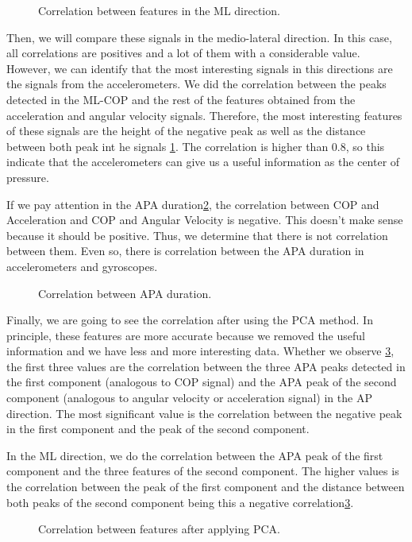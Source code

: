 \begin{figure}[H]
	\centering
	\caption{Correlation between features in the ML direction.}
	\label{fig:Corr_ML}
\end{figure}

Then, we will compare these signals in the medio-lateral direction. In this case, all correlations are positives and a lot of them with a considerable value. However, we can identify that the most interesting signals in this directions are the signals from the accelerometers. We did the correlation between the peaks detected in the ML-COP and the rest of the features obtained from the acceleration and angular velocity signals. Therefore, the most interesting features of these signals are the height of the negative peak as well as the distance between both peak int he signals \ref{fig:Corr_ML}. The correlation is higher than 0.8, so this indicate that the accelerometers can give us a useful information as the center of pressure.

If we pay attention in the APA duration\ref{fig:Corr_duration}, the correlation between COP and Acceleration and COP and Angular Velocity is negative. This doesn't make sense because it should be positive. Thus, we determine that there is not correlation between them. Even so, there is correlation between the APA duration in accelerometers and gyroscopes.
\begin{figure}[H]
	\centering
	\caption{Correlation between APA duration.}
	\label{fig:Corr_duration}
\end{figure}

Finally, we are going to see the correlation after using the PCA method. In principle, these features are more accurate because we removed the useful information and we have less and more interesting data.
Whether we observe \ref{fig:Corr_PCA}, the first three values are the correlation between the three APA peaks detected in the first component (analogous to COP signal) and the APA peak of the second component (analogous to angular velocity or acceleration signal) in the AP direction. The most significant value is the correlation between the negative peak in the first component and the peak of the second component.

In the ML direction, we do the correlation between the APA peak of the first component and the three features of the second component. The higher values is the correlation between the peak of the first component and the distance between both peaks of the second component being this a negative correlation\ref{fig:Corr_PCA}.

\begin{figure}[H]
	\centering
	\caption{Correlation between features after applying PCA.}
	\label{fig:Corr_PCA}
\end{figure}